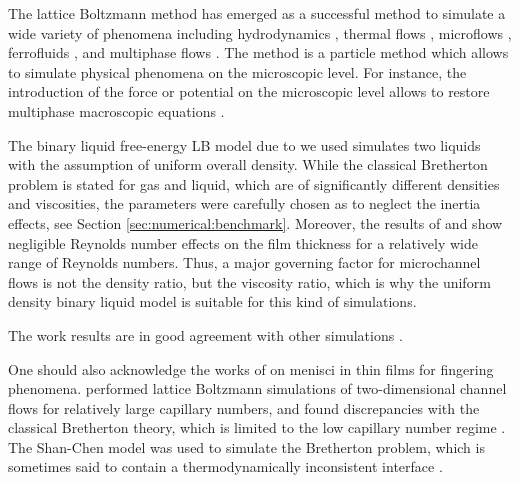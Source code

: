 \documentclass{article}
\begin{document}
The lattice Boltzmann method has emerged as a successful method to simulate
a wide variety of phenomena including hydrodynamics \cite{yu}, thermal flows
\cite{karlin-minimalmodels}, microflows \cite{ansumali-small-knudsen},
ferrofluids \cite{kuzmin-aniso}, and multiphase flows
\cite{swift,Shan-chen:extended}. The method is a particle method which allows to simulate physical
phenomena on the microscopic level. For instance, the introduction of the force or potential on the
microscopic level allows to restore multiphase macroscopic equations \cite{swift,
Shan-chen:extended}.

The binary liquid free-energy LB model due to \citet{swift} we used
simulates two liquids with the assumption of uniform overall
density. While the classical Bretherton problem is stated for gas and liquid, which are of
significantly
different densities and viscosities, the parameters were carefully chosen as to neglect the inertia
effects, see Section \ref{sec:numerical:benchmark}. Moreover, the results of
\citet{giavedoni-numerical} and \citet{heil-bretherton} show
negligible Reynolds number effects on the film thickness for a relatively wide range of Reynolds
numbers. Thus, a major governing factor for microchannel flows is not the density ratio, but
the
viscosity ratio, which is why the uniform density binary liquid model is suitable for this kind of
simulations.


The work results are in good agreement with other simulations \cite{heil-threedim,wang-non-circular}.

One should also acknowledge the works of \citet{pagonabarraga-fingers} on menisci
in thin films for fingering phenomena. \citet{sehgal-microchannel} performed lattice Boltzmann
simulations of two-dimensional channel flows for relatively large capillary numbers, and
found discrepancies with the classical Bretherton theory, which
is limited to the low capillary number regime \cite{giavedoni-numerical}. The Shan-Chen model was
used to simulate the Bretherton problem, which is sometimes said to contain a thermodynamically
inconsistent interface \cite{nourgaliev-breakup}. 
\end{document}
